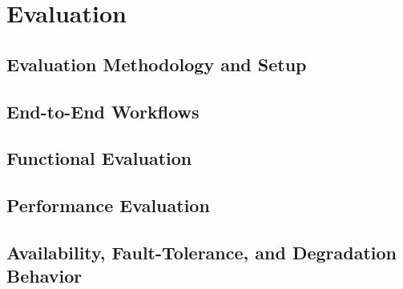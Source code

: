 \documentclass[a4paper,twoside]{sapthesis}
\begin{document}
\chapter{Evaluation}
\label{ch:evaluation}


\section{Evaluation Methodology and Setup}
\label{sec:eval-methodology}

\section{End-to-End Workflows}
\label{sec:e2e-workflows}

\section{Functional Evaluation}
\label{sec:functional-eval}

\section{Performance Evaluation}
\label{sec:performance-eval}

\section{Availability, Fault-Tolerance, and Degradation Behavior}
\label{sec:availability-ft}
\end{document}
